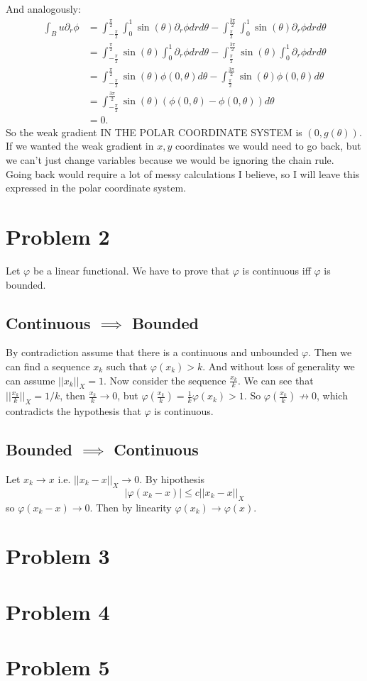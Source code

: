 \documentclass{article}
\begin{document}
And analogously:
\begin{align*}
	\int_{B}u\partial_r\phi &=\int_{-\frac{\pi}{2}}^{\frac{\pi}{2}} \int_0^1 \sin(\theta)\partial_r\phi drd\theta
		      -\int_{\frac{\pi}{2}}^{\frac{3\pi}{2}} \int_0^1 \sin(\theta)\partial_r\phi drd\theta\\
		  &=\int_{-\frac{\pi}{2}}^{\frac{\pi}{2}} \sin(\theta)\int_0^1 \partial_r\phi drd\theta
		      -\int_{\frac{\pi}{2}}^{\frac{3\pi}{2}} \sin(\theta)\int_0^1 \partial_r\phi drd\theta\\
		  &=\int_{-\frac{\pi}{2}}^{\frac{\pi}{2}} \sin(\theta) \phi(0,\theta)d\theta
		      -\int_{\frac{\pi}{2}}^{\frac{3\pi}{2}} \sin(\theta)\phi(0,\theta) d\theta\\
		  &=\int_{-\frac{\pi}{2}}^{\frac{3\pi}{2}} \sin(\theta) (\phi(0,\theta)-\phi(0,\theta))d\theta\\
		  &=0.
\end{align*}
So the weak gradient IN THE POLAR COORDINATE SYSTEM is $(0,g(\theta))$. If we
wanted the weak gradient in $x,y$ coordinates we would need to go back, but we
can't just change variables because we would be ignoring the chain rule. Going
back would require a lot of messy calculations I believe, so I will leave this
expressed in the polar coordinate system.
\section*{Problem 2}
Let $\varphi$ be a linear functional. We have to prove that $\varphi$ is continuous
iff $\varphi$ is bounded.
\subsection*{Continuous $\implies$ Bounded}
By contradiction assume that there is a continuous and unbounded $\varphi$.
Then we can find a sequence $x_k$ such that $\varphi(x_k)>k$. And without loss
of generality we can assume $||x_k||_X=1$. Now consider the sequence
$\frac{x_k}{k}$. We can see that $||\frac{x_k}{k}||_X=1/k$, then $\frac{x_k}{k}
\to 0$, but $\varphi(\frac{x_k}{k})=\frac{1}{k}\varphi(x_k)>1$. So
$\varphi(\frac{x_k}{k}) \not \to 0$, which contradicts the hypothesis that
$\varphi$ is continuous.
\subsection*{Bounded $\implies$ Continuous}
Let $x_k \to x$ i.e. $||x_k-x||_X \to 0$. By hipothesis
\[
	|\varphi(x_k-x)|\leq c ||x_k-x||_X
\]
so $\varphi(x_k-x) \to 0$. Then by linearity $\varphi(x_k)\to \varphi(x)$.

\section*{Problem 3}
\section*{Problem 4}
\section*{Problem 5}
\end{document}
